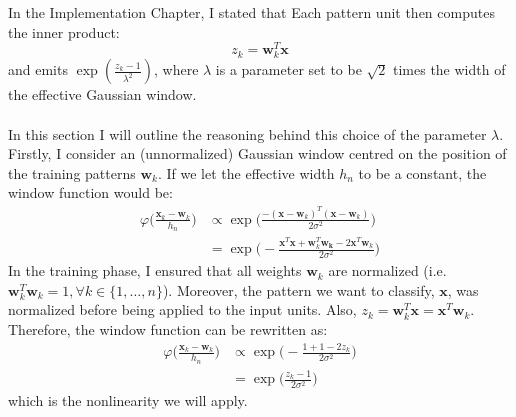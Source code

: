 In the Implementation Chapter, I stated that Each pattern unit then computes the inner product:
\begin{equation}
z_k = \mathbf{w}_k^T \mathbf{x}
\label{Eq: appendix/pnn/innerprod}
\end{equation}   
and emits $\exp(\frac{z_k-1}{\lambda^2})$, where $\lambda$ is a parameter set to be $\sqrt{2}$ times the width of the effective Gaussian window. 
\\ \\
In this section I will outline the reasoning behind this choice of the parameter $\lambda$. Firstly, I consider an (unnormalized) Gaussian window centred on the position of the training patterns $\mathbf{w}_k$. If we let the effective width $h_n$ to be a constant, the window function would be:
\begin{equation}
\begin{split}
\varphi\bigg(\frac{\mathbf{x}_k - \mathbf{w}_k}{h_n}\bigg) & \propto \exp\bigg(\frac{
	-(\mathbf{x}-\mathbf{w}_k)^T(\mathbf{x}-\mathbf{w}_k)
}{
	2\sigma^2
}\bigg) \\
& = \exp\bigg(
-
\frac{
	\mathbf{x}^T\mathbf{x} + \mathbf{w}_k^T\mathbf{w_k} - 2\mathbf{x}^T\mathbf{w}_k 	
}{
	2\sigma^2
}
\bigg)
\end{split}
\end{equation}
In the training phase, I ensured that all weights $\mathbf{w}_k$ are normalized (i.e. $\mathbf{w}_k^T\mathbf{w}_k = 1, \forall k \in \{1,\dots,n\}$). Moreover, the pattern we want to classify, $\mathbf{x}$, was normalized before being applied to the input units. Also, $z_k = \mathbf{w}_k^T\mathbf{x} = \mathbf{x}^T\mathbf{w}_k$. Therefore, the window function can be rewritten as: 
\begin{equation}
\begin{split}
\varphi\bigg(\frac{\mathbf{x}_k - \mathbf{w}_k}{h_n}\bigg) & \propto
\exp\bigg(
-
\frac{
	1 + 1 - 2z_k
}{
	2\sigma^2
}
\bigg) \\
& = \exp \bigg(
\frac{
	z_k - 1
}{
	2\sigma^2
}
\bigg)
\end{split}
\end{equation}
which is the nonlinearity we will apply. 
